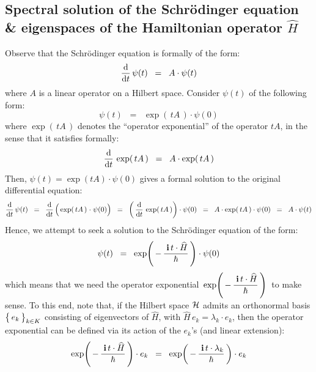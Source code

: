
\vskip 1.0cm
\subsection{Spectral solution of the Schr\"{o}dinger equation \& eigenspaces of the Hamiltonian operator $\widehat{H}$}

Observe that the Schr\"{o}dinger equation is formally of the form:
\begin{equation*}
\dfrac{\textnormal{d}}{\textnormal{d} t}\,\psi(t) \;\; = \;\; A \cdot\psi(t)
\end{equation*}
where $A$ is a linear operator on a Hilbert space.
Consider $\psi(t)$ of the following form:
\begin{equation*}
\psi(t)
\;\; = \;\;
	\exp\!\left(\,tA\,\right)\cdot\psi(0)
\end{equation*}
where $\exp\!\left(\,tA\,\right)$ denotes the ``operator exponential''
of the operator $t A$, in the sense that it satisfies formally:
\begin{equation*}
\dfrac{\textnormal{d}}{\textnormal{d} t}\,\exp\!\left(\,tA\,\right)
\;\; = \;\;
	A \cdot \exp\!\left(\,tA\,\right)
\end{equation*}
Then, $\psi(t) = \exp(tA)\cdot\psi(0)$ gives a formal solution to the original differential equation:
\begin{equation*}
\dfrac{\d}{\d t}\,\psi(t)
\;\; = \;\;
	\dfrac{\d}{\d t}\left(\,\exp\!\left(\,tA\,\right)\overset{{\color{white}1}}{\cdot}\psi(0)\right)
\;\; = \;\;
	\left(\,\dfrac{\d}{\d t}\,\exp\!\left(\,tA\,\right)\right)\cdot\psi(0)
\;\; = \;\;
	A \cdot \exp\!\left(\,tA\,\right)\cdot\psi(0)
\;\; = \;\;
	A \cdot\psi(t)
\end{equation*}
Hence, we attempt to seek a solution to the Schr\"{o}dinger equation of the form:
\begin{equation*}
\psi(t)
\;\; = \;\;
	\exp\!\left(\,-\,\dfrac{{\color{white}.}\i\,t\cdot\widehat{H}}{\hbar}\,\right)\cdot\psi(0)
\end{equation*}
which means that we need the operator exponential
\,$\exp\!\left(\,-\,\dfrac{{\color{white}.}\i\,t\cdot\widehat{H}}{\hbar}\,\right)$\,
to make sense.
To this end, note that, if the Hilbert space $\mathcal{H}$ admits an orthonormal basis
$\left\{\,\overset{{\color{white}.}}{e_{k}}\,\right\}_{k \in K}$
consisting of eigenvectors of $\widehat{H}$,
with
$\widehat{H}\,e_{k} = \lambda_{k}\cdot e_{k}$,
then the operator exponential can be
defined via its action of the $e_{k}$'s (and linear extension):
\begin{equation*}
\exp\!\left(\,-\,\dfrac{{\color{white}.}\i\,t\cdot\widehat{H}}{\hbar}\,\right)\cdot e_{k}
\;\; = \;\;
	\exp\!\left(\,-\,\dfrac{{\color{white}.}\i\,t\cdot\lambda_{k}}{\hbar}\,\right)\cdot e_{k}
\end{equation*}
